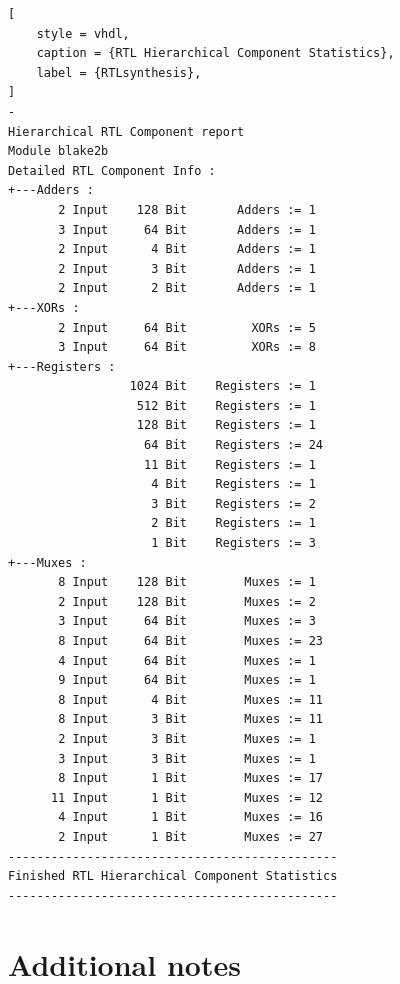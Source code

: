 \documentclass[%
	a4paper,
]
{article}
\begin{document}
\begin{lstlisting}[
	style = vhdl,
	caption = {RTL Hierarchical Component Statistics},
	label = {RTLsynthesis},
]
-
Hierarchical RTL Component report 
Module blake2b 
Detailed RTL Component Info : 
+---Adders : 
	   2 Input    128 Bit       Adders := 1     
	   3 Input     64 Bit       Adders := 1     
	   2 Input      4 Bit       Adders := 1     
	   2 Input      3 Bit       Adders := 1     
	   2 Input      2 Bit       Adders := 1     
+---XORs : 
	   2 Input     64 Bit         XORs := 5     
	   3 Input     64 Bit         XORs := 8     
+---Registers : 
	             1024 Bit    Registers := 1     
	              512 Bit    Registers := 1     
	              128 Bit    Registers := 1     
	               64 Bit    Registers := 24    
	               11 Bit    Registers := 1    
	                4 Bit    Registers := 1     
	                3 Bit    Registers := 2     
	                2 Bit    Registers := 1     
	                1 Bit    Registers := 3     
+---Muxes : 
	   8 Input    128 Bit        Muxes := 1     
	   2 Input    128 Bit        Muxes := 2     
	   3 Input     64 Bit        Muxes := 3     
	   8 Input     64 Bit        Muxes := 23    
	   4 Input     64 Bit        Muxes := 1     
	   9 Input     64 Bit        Muxes := 1     
	   8 Input      4 Bit        Muxes := 11    
	   8 Input      3 Bit        Muxes := 11    
	   2 Input      3 Bit        Muxes := 1     
	   3 Input      3 Bit        Muxes := 1     
	   8 Input      1 Bit        Muxes := 17    
	  11 Input      1 Bit        Muxes := 12    
	   4 Input      1 Bit        Muxes := 16    
	   2 Input      1 Bit        Muxes := 27    
----------------------------------------------
Finished RTL Hierarchical Component Statistics
----------------------------------------------

\end{lstlisting}
%
%
\section{Additional notes}
\label{sec:additional-notes}
\end{document}
